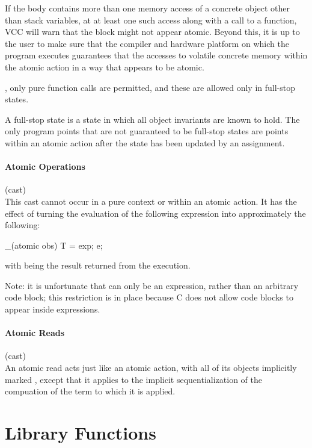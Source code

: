 \documentclass[preprint,nocopyrightspace]{sigplanconf}
\newcommand{\subsubsubsection}[1]{\paragraph{#1}}
\begin{document}
{{{If the body contains more than one memory access of a concrete object
other than stack variables, at at least one such access along with a
call to a  function, VCC will warn that the block might
not appear atomic. Beyond this, it is up to the user to make sure that the
compiler and hardware platform on which the program executes guarantees that 
the accesses to volatile concrete memory within the
atomic action in a way that appears to be atomic. 

, only pure function calls are permitted, and 
these are allowed only in full-stop states. 

A full-stop state is a state in which all object invariants are known
to hold. The only program points that are not guaranteed to be
full-stop states are points within an atomic action after the state
has been updated by an assignment.

\subsubsubsection{Atomic Operations}

\noindent{} (cast)\\
This cast cannot occur in a pure context or within an atomic action.
It has the effect of turning the evaluation of the following
expression  into approximately the following:
\begin{VCC}
_(atomic obs) {
  T \result = exp;
  e;
}
\end{VCC}
with \vcc{\result} being the result returned from the execution. 

Note: it is unfortunate that  can only be an expression, rather
than an arbitrary code block; this restriction is in place because C
does not allow code blocks to appear inside expressions. 

\subsubsubsection{Atomic Reads}

 (cast)\\
An atomic read acts just like an atomic action, with all of its
objects implicitly marked , except that it applies
to the implicit sequentialization of the compuation of the term to
which it is applied.

\section{Library Functions}

}}}
\end{document}
